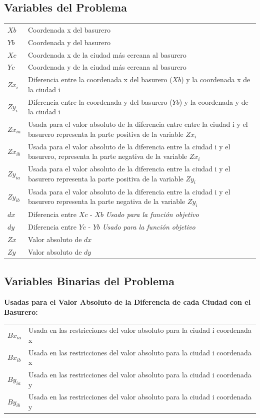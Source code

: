 \documentclass[10pt]{article}
\begin{document}
\subsection{Variables del Problema}
\begin{tabular}{p{1cm} p{}}
$Xb$ & Coordenada x del basurero \\
$Yb$ & Coordenada y del basurero \\
$Xc$ & Coordenada x de la ciudad m\'as cercana al basurero \\
$Yc$ & Coordenada y de la ciudad m\'as cercana al basurero \\
$Zx_i$ & Diferencia entre la coordenada x del basurero ($Xb$) y la coordenada x de la ciudad i\\
$Zy_i$ & Diferencia entre la coordenada y del basurero ($Yb$) y la coordenada y de la ciudad i\\
$Zx_{ia}$ & Usada para el valor absoluto de la diferencia entre entre la ciudad i y el basurero representa la parte positiva de la variable $Zx_i$\\
$Zx_{ib}$ & Usada para el valor absoluto de la diferencia entre la ciudad i y el basurero, representa la parte negativa de la variable $Zx_i$\\
$Zy_{ia}$ & Usada para el valor absoluto de la diferencia entre la ciudad i y el basurero representa la parte positiva de la variable $Zy_i$\\
$Zy_{ib}$ & Usada para el valor absoluto de la diferencia entre la ciudad i y el basurero representa la parte negativa de la variable $Zy_i$\\
$dx$ & Diferencia entre $Xc$ - $Xb$ \emph{Usado para la funci\'on objetivo}\\
$dy$ &  Diferencia entre $Yc$ - $Yb$ \emph{Usado para la funci\'on objetivo}\\
$Zx$ & Valor absoluto de $dx$\\
$Zy$ & Valor absoluto de $dy$ \\
\end{tabular}


\subsection{Variables Binarias del Problema}
\textbf{Usadas para el Valor Absoluto de la Diferencia de cada Ciudad con el Basurero: }\\

\begin{tabular}{l l }
 $Bx_{ia}$ & Usada en las restricciones del valor absoluto para la ciudad i coordenada x \\
$Bx_{ib}$ & Usada en las restricciones del valor absoluto para la ciudad i  coordenada x \\
$By_{ia}$ & Usada en las restricciones del valor absoluto para la ciudad i coordenada y \\
$By_{ib}$ & Usada en las restricciones del valor absoluto para la ciudad i coordenada y \\

\end{tabular}\bigskip 
\end{document}
